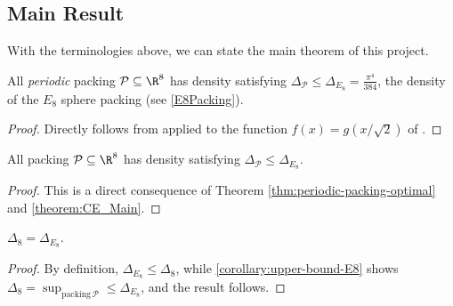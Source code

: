 \subsection{Main Result}

With the terminologies above, we can state the main theorem of this project.

\begin{theorem}\label{theorem:CE_Main}\leanok
  All \emph{periodic} packing $\mathcal{P} \subseteq \R^8$ has density satisfying $\Delta_{\mathcal{P}} \leq \Delta_{E_8} = \frac{\pi^4}{384}$, the density of the $E_8$ sphere packing (see \cref{E8Packing}).
\end{theorem}
\begin{proof}\leanok
  Directly follows from  applied to the function $f(x)=g(x/\sqrt{2})$ of .
\end{proof}

\begin{corollary}\label{corollary:upper-bound-E8}\leanok
  All packing $\mathcal{P} \subseteq \R^8$ has density satisfying $\Delta_{\mathcal{P}} \leq \Delta_{E_8}$.
\end{corollary}
\begin{proof}\leanok
  This is a direct consequence of Theorem \cref{thm:periodic-packing-optimal} and \cref{theorem:CE_Main}.
\end{proof}

\begin{corollary}\label{MainTheorem-d8}\leanok
  $\Delta_8 = \Delta_{E_8}$.
\end{corollary}
\begin{proof}\leanok
  By definition, $\Delta_{E_8} \leq \Delta_8$, while \cref{corollary:upper-bound-E8} shows $\Delta_8 = \sup_{\mathrm{packing} \, \mathcal{P}} \leq \Delta_{E_8}$, and the result follows.
\end{proof}

